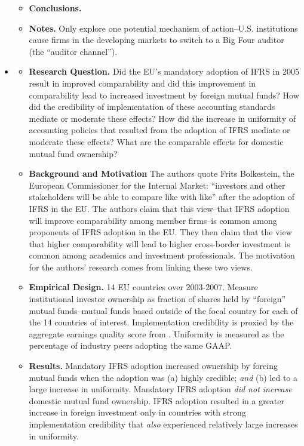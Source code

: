 \documentclass[12pt, letterpaper]{article}
\begin{document}
\begin{itemize}
\begin{itemize}
    \item \textbf{Conclusions.}

    \item \textbf{Notes.} Only explore one potential mechanism of action--U.S. institutions cause firms in the developing markets to switch to a Big Four auditor (the ``auditor channel'').
    \end{itemize}

\item \cite{defondetal2011}
   \begin{itemize}
    \item \textbf{Research Question.} Did the EU's mandatory adoption of IFRS in 2005 result in 
improved comparability and did this improvement in comparability lead to increased investment by foreign mutual funds? How did the credibility of implementation of these accounting standards mediate or moderate these effects? How did the increase in uniformity of accounting policies that resulted from the adoption of IFRS mediate or moderate these effects? What are the comparable effects for domestic mutual fund ownership?

    \item \textbf{Background and Motivation} The authors quote Frits Bolkestein, the European Commissioner for the Internal Market: ``investors and other stakeholders will be able to compare like with like'' after the adoption of IFRS in the EU. The authors claim that this view--that IFRS adoption will improve comparability among member firms--is common among proponents of IFRS adoption in the EU. They then claim that the view that higher comparability will lead to higher cross-border investment is common among academics and investment professionals. The motivation for the authors' research comes from linking these two views.

    \item \textbf{Empirical Design.} 14 EU countries over 2003-2007. Measure institutional investor 
ownership as fraction of shares held by ``foreign'' mutual funds--mutual funds based outside of the focal country for each of the 14 countries of interest. Implementation credibility is proxied by the aggregate earnings quality score from \cite{leuzetal2003}. Uniformity is measured as the percentage of industry peers adopting the same GAAP.

    \item \textbf{Results.} Mandatory IFRS adoption increased ownership by foreing mutual funds when the adoption was (a) highly credible; \emph{and} (b) led to a large increase in uniformity. Mandatory IFRS adoption \emph{did not increase} domestic mutual fund ownership. IFRS adoption resulted in a greater increase in foreign investment only in countries with strong implementation credibility that \emph{also} experienced relatively large increases in uniformity. 


\end{itemize}
\end{itemize}
\end{document}

